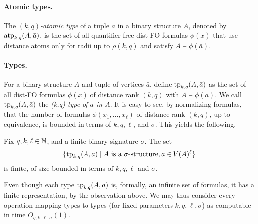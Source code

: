 \paragraph{Atomic types.}
The \emph{$(k,q)$-atomic type} of a tuple \(\bar a\) in a binary structure \(A\),
denoted by \(\textnormal{atp}_{k,q}(A,\bar a)\), is the set of all quantifier-free dist-FO formulas \(\phi(\bar x)\)
that use distance atoms only for radii up to \(\rho(k,q)\) and satisfy \(A \models \phi(\bar a)\).


\paragraph{Types.}
For a binary structure \(A\) and tuple of vertices \(\bar a\),
define \(\textnormal{tp}_{k,q}(A,\bar a)\) as the set of all dist-FO formulas \(\phi(\bar x)\) of distance rank \((k,q)\)
with \(A \models \phi(\bar a)\).
We call \(\textnormal{tp}_{k,q}(A,\bar a)\) the \emph{(k,q)-type of \(\bar a\) in \(A\)}.
It is easy to see, by normalizing formulas, that the number of formulas $\phi(x_1,\ldots,x_\ell)$ of distance-rank $(k,q)$, up to equivalence, is bounded in terms of $k,q,\ell$, and $\sigma$.
This yields the following.

\begin{observation}\label{obs:typebound}
    Fix $q,k,\ell\in\mathbb N$, and a finite binary signature $\sigma$. The set
    $$\{\textnormal{tp}_{k,q}(A,\bar a)\mid{{A}}\text{ is a $\sigma$-structure}, \bar a\in V(A)^\ell\}$$ is finite, of size bounded in terms of $k,q,\ell$ and $\sigma$.
\end{observation}

\begin{remark}
Even though each type \(\textnormal{tp}_{k,q}(A,\bar a)\) is, formally, an infinite set of formulas, it has a finite representation, by the observation above. 
We may thus 
consider every operation mapping types to types (for fixed parameters $k,q,\ell,\sigma$) as computable in time $O_{q,k,\ell,\sigma}(1)$.
\end{remark}






